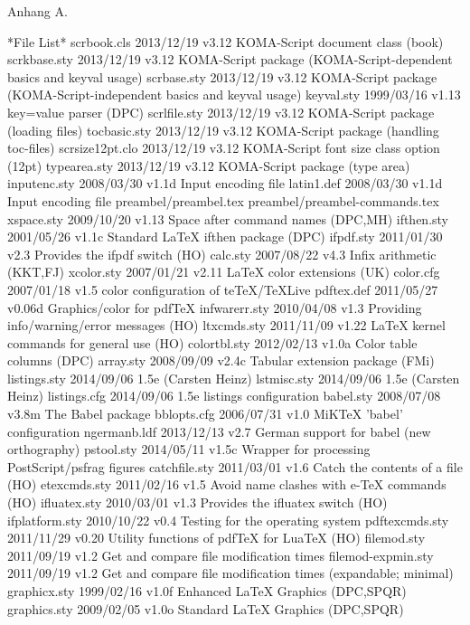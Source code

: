 Anhang A.

 *File List*
 scrbook.cls    2013/12/19 v3.12 KOMA-Script document class (book)
scrkbase.sty    2013/12/19 v3.12 KOMA-Script package (KOMA-Script-dependent basics and keyval usage)
 scrbase.sty    2013/12/19 v3.12 KOMA-Script package (KOMA-Script-independent basics and keyval usage)
  keyval.sty    1999/03/16 v1.13 key=value parser (DPC)
scrlfile.sty    2013/12/19 v3.12 KOMA-Script package (loading files)
tocbasic.sty    2013/12/19 v3.12 KOMA-Script package (handling toc-files)
scrsize12pt.clo    2013/12/19 v3.12 KOMA-Script font size class option (12pt)
typearea.sty    2013/12/19 v3.12 KOMA-Script package (type area)
inputenc.sty    2008/03/30 v1.1d Input encoding file
  latin1.def    2008/03/30 v1.1d Input encoding file
preambel/preambel.tex
preambel/preambel-commands.tex
  xspace.sty    2009/10/20 v1.13 Space after command names (DPC,MH)
  ifthen.sty    2001/05/26 v1.1c Standard LaTeX ifthen package (DPC)
   ifpdf.sty    2011/01/30 v2.3 Provides the ifpdf switch (HO)
    calc.sty    2007/08/22 v4.3 Infix arithmetic (KKT,FJ)
  xcolor.sty    2007/01/21 v2.11 LaTeX color extensions (UK)
   color.cfg    2007/01/18 v1.5 color configuration of teTeX/TeXLive
  pdftex.def    2011/05/27 v0.06d Graphics/color for pdfTeX
infwarerr.sty    2010/04/08 v1.3 Providing info/warning/error messages (HO)
 ltxcmds.sty    2011/11/09 v1.22 LaTeX kernel commands for general use (HO)
colortbl.sty    2012/02/13 v1.0a Color table columns (DPC)
   array.sty    2008/09/09 v2.4c Tabular extension package (FMi)
listings.sty    2014/09/06 1.5e (Carsten Heinz)
 lstmisc.sty    2014/09/06 1.5e (Carsten Heinz)
listings.cfg    2014/09/06 1.5e listings configuration
   babel.sty    2008/07/08 v3.8m The Babel package
 bblopts.cfg    2006/07/31 v1.0 MiKTeX 'babel' configuration
ngermanb.ldf    2013/12/13 v2.7 German support for babel (new orthography)
  pstool.sty    2014/05/11 v1.5c Wrapper for processing PostScript/psfrag figures
catchfile.sty    2011/03/01 v1.6 Catch the contents of a file (HO)
etexcmds.sty    2011/02/16 v1.5 Avoid name clashes with e-TeX commands (HO)
ifluatex.sty    2010/03/01 v1.3 Provides the ifluatex switch (HO)
ifplatform.sty    2010/10/22 v0.4 Testing for the operating system
pdftexcmds.sty    2011/11/29 v0.20 Utility functions of pdfTeX for LuaTeX (HO)
 filemod.sty    2011/09/19 v1.2 Get and compare file modification times
filemod-expmin.sty    2011/09/19 v1.2 Get and compare file modification times (expandable; minimal)
graphicx.sty    1999/02/16 v1.0f Enhanced LaTeX Graphics (DPC,SPQR)
graphics.sty    2009/02/05 v1.0o Standard LaTeX Graphics (DPC,SPQR)
